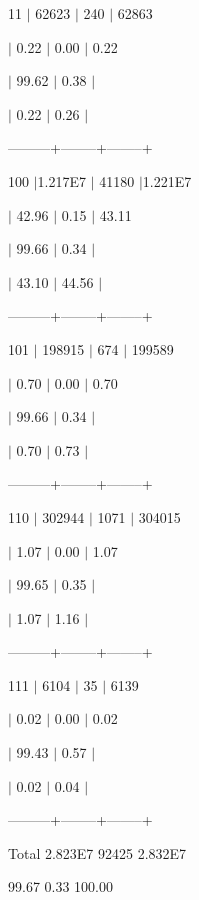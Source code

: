 \textsf{11 $\vert $ 62623 $\vert $ 240 $\vert $ 62863}

\textsf{$\vert $ 0.22 $\vert $ 0.00 $\vert $ 0.22}

\textsf{$\vert $ 99.62 $\vert $ 0.38 $\vert $}

\textsf{$\vert $ 0.22 $\vert $ 0.26 $\vert $}

\textsf{---------+--------+--------+}

\textsf{100 $\vert $1.217E7 $\vert $ 41180 $\vert $1.221E7}

\textsf{$\vert $ 42.96 $\vert $ 0.15 $\vert $ 43.11}

\textsf{$\vert $ 99.66 $\vert $ 0.34 $\vert $}

\textsf{$\vert $ 43.10 $\vert $ 44.56 $\vert $}

\textsf{---------+--------+--------+}

\textsf{101 $\vert $ 198915 $\vert $ 674 $\vert $ 199589}

\textsf{$\vert $ 0.70 $\vert $ 0.00 $\vert $ 0.70}

\textsf{$\vert $ 99.66 $\vert $ 0.34 $\vert $}

\textsf{$\vert $ 0.70 $\vert $ 0.73 $\vert $}

\textsf{---------+--------+--------+}

\textsf{110 $\vert $ 302944 $\vert $ 1071 $\vert $ 304015}

\textsf{$\vert $ 1.07 $\vert $ 0.00 $\vert $ 1.07}

\textsf{$\vert $ 99.65 $\vert $ 0.35 $\vert $}

\textsf{$\vert $ 1.07 $\vert $ 1.16 $\vert $}

\textsf{---------+--------+--------+}

\textsf{111 $\vert $ 6104 $\vert $ 35 $\vert $ 6139}

\textsf{$\vert $ 0.02 $\vert $ 0.00 $\vert $ 0.02}

\textsf{$\vert $ 99.43 $\vert $ 0.57 $\vert $}

\textsf{$\vert $ 0.02 $\vert $ 0.04 $\vert $}

\textsf{---------+--------+--------+}

\textsf{Total 2.823E7 92425 2.832E7}

\textsf{99.67 0.33 100.00}



